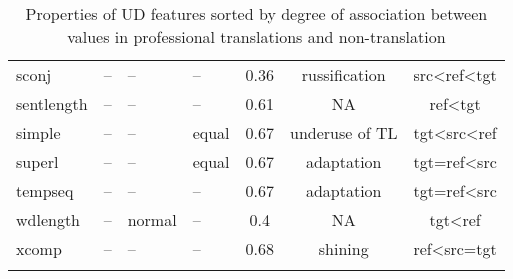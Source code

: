 \begin{longtable}{l|p{2cm}p{2cm}p{1.5cm}ccc}
	sconj         & -- & -- & --       & 0.36    & russification  & src\textless{}ref\textless{}tgt \\
	sentlength    & -- & -- & --       & 0.61    & NA  & ref\textless{}tgt \\
	simple        & -- & -- & equal    & 0.67    & underuse of TL & tgt\textless{}src\textless{}ref \\
	superl        & -- & -- & equal    & 0.67    & adaptation     & tgt=ref\textless{}src           \\
	tempseq       & -- & -- & --       & 0.67    & adaptation     & tgt=ref\textless{}src           \\
	wdlength      & -- & normal       & --       & 0.4     & NA  & tgt\textless{}ref \\
	xcomp         & -- & -- & --       & 0.68    & shining        & ref\textless{}src=tgt \\
	\bottomrule
	\caption{\label{tab:pro_indicators}Properties of UD features sorted by degree of association between values in professional translations and non-translation}\\
\end{longtable}


